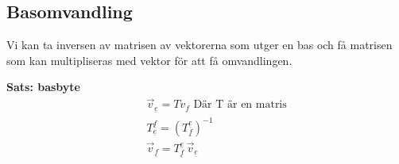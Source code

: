\begin{multicols}{2}
\section{Basomvandling}
Vi kan ta inversen av matrisen av vektorerna som utger en bas och få
matrisen som kan multipliseras med vektor för att få omvandlingen.

\textbf{Sats: basbyte}
\begin{align*}
  &\quad  \vec{v}_{\underline{e}} = Tv_{f} \text{ Där T är en matris} \\
  &\quad  T^{\underline{f}}_{\underline{e}} = {(T^{\underline{e}}_{\underline{f}})}^{-1} \\
  &\quad  \vec{v}_{\underline{f}} = T^{\underline{e}}_{\underline{f}} \, \vec{v}_{\underline{e}} \\
\end{align*}


\end{multicols}
